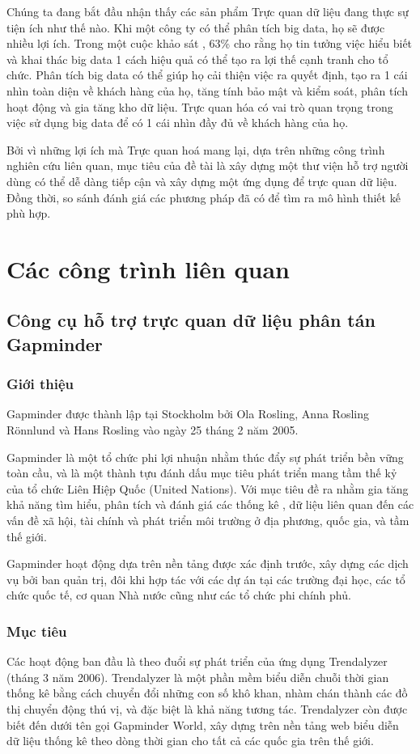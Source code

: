 \documentclass[12pt,a4paper,oneside]{article}
\begin{document}
Chúng ta đang bắt đầu nhận thấy các sản phẩm Trực quan dữ liệu đang thực sự tiện ích như thế nào. Khi một công ty có thể phân tích big data, họ sẽ được nhiều lợi ích. Trong một cuộc khảo sát \cite{paper1}, 63\% cho rằng họ tin tưởng việc hiểu biết và khai thác big data 1 cách hiệu quả có thể tạo ra lợi thế cạnh tranh cho tổ chức. Phân tích big data có thể giúp họ cải thiện việc ra quyết định, tạo ra 1 cái nhìn toàn diện về khách hàng của họ, tăng tính bảo mật và kiểm soát, phân tích hoạt động và gia tăng kho dữ liệu. Trực quan hóa có vai trò quan trọng trong việc sử dụng big data để có 1 cái nhìn đầy đủ về khách hàng của họ.

Bởi vì những lợi ích mà Trực quan hoá mang lại, dựa trên những công trình nghiên cứu liên quan, mục tiêu của đề tài là xây dựng một thư viện hỗ trợ người dùng có thể dễ dàng tiếp cận và xây dựng một ứng dụng để trực quan dữ liệu. Đồng thời, so sánh  đánh giá các phương pháp đã có để tìm ra mô hình thiết kế phù hợp.  

\section{Các công trình liên quan}
\subsection{Công cụ hỗ trợ trực quan dữ liệu phân tán Gapminder}
\subsubsection{Giới thiệu}
Gapminder\cite{gapminder} được thành lập tại Stockholm bởi Ola Rosling, Anna Rosling Rönnlund và Hans Rosling vào ngày 25 tháng 2 năm 2005. 

Gapminder là một tổ chức phi lợi nhuận nhằm thúc đẩy sự phát triển bền vững toàn cầu, và là một thành tựu đánh dấu mục tiêu phát triển mang tầm thế kỷ của tổ chức Liên Hiệp Quốc (United Nations). Với mục tiêu đề ra nhằm gia tăng khả năng tìm hiểu, phân tích và đánh giá các thống kê , dữ liệu liên quan đến các vấn đề xã hội, tài chính và phát triển môi trường ở địa phương, quốc gia, và tầm thế giới.

Gapminder hoạt động dựa trên nền tảng được xác định trước, xây dựng các dịch vụ bởi ban quản trị, đôi khi hợp tác với các dự án  tại các trường đại học, các tổ chức quốc tế, cơ quan Nhà nước cũng như các tổ chức phi chính phủ.

\subsubsection{Mục tiêu}
Các hoạt động ban đầu là theo đuổi sự phát triển của ứng dụng Trendalyzer (tháng 3 năm 2006). Trendalyzer là một phần mềm biểu diễn chuỗi thời gian thống kê bằng cách chuyển đổi những con số khô khan, nhàm chán thành các đồ thị chuyển động thú vị, và đặc biệt là khả năng tương tác. Trendalyzer còn được biết đến dưới tên gọi Gapminder World, xây dựng trên nền tảng web biểu diễn dữ liệu thống kê theo dòng thời gian cho tất cả các quốc gia trên thế giới.
\end{document}
